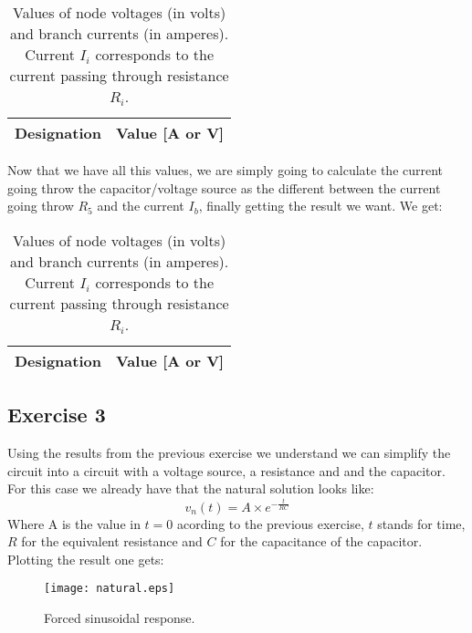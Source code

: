 \begin{table}[H]
  \centering
  \begin{tabular}{|c|c|}
    \hline
        {\bf Designation} & {\bf Value [A or V]} \\ \hline
        
  \end{tabular}
  \caption{Values of node voltages (in volts) and branch currents (in amperes). Current $I_i$ corresponds to the current passing through resistance $R_i$.}
  \label{tab:Exercise2Theoretical}
\end{table}
Now that we have all this values, we are simply going to calculate the current going throw the capacitor/voltage source as the different between the current going throw $R_5$ and the current $I_b$, finally getting the result we want. We get:
\begin{table}[H]
  \centering
  \begin{tabular}{|c|c|}
    \hline
        {\bf Designation} & {\bf Value [A or V]} \\ \hline
        
  \end{tabular}
  \caption{Values of node voltages (in volts) and branch currents (in amperes). Current $I_i$ corresponds to the current passing through resistance $R_i$.}
  \label{tab:Exercise2.1Theoretical}
\end{table}

\subsection{Exercise 3}
Using the results from the previous exercise we understand we can simplify the circuit into a circuit with a voltage source, a resistance and and the capacitor. For this case we already have that the natural solution looks like:
\begin{equation}
  v_n(t)=A \times e^{-\frac{t}{RC}}
  \end{equation}
Where A is the value in $t=0$ acording to the previous exercise, $t$ stands for time, $R$ for the equivalent resistance and $C$ for the capacitance of the capacitor. Plotting the result one gets:
\begin{figure}[h] \centering
\texttt{[image: natural.eps]}
\caption{Forced sinusoidal response.}
\label{fig:forced}
\end{figure}
